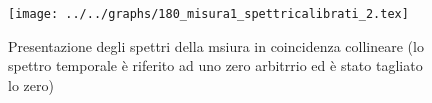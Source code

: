 \begin{figure}[h] \centering\texttt{[image: ../../graphs/180\_misura1\_spettricalibrati\_2.tex]}\caption{Presentazione degli spettri della msiura in coincidenza collineare (lo spettro temporale è riferito ad uno zero arbitrrio ed è stato tagliato lo zero) }\label{gr:180_misura1_spettricalibrati_2} \end{figure}
